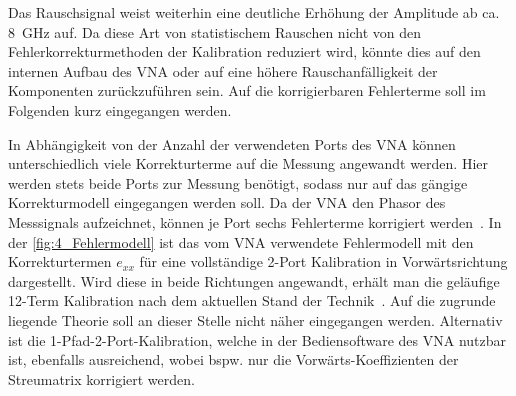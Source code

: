 Das Rauschsignal weist weiterhin eine deutliche Erhöhung der Amplitude ab ca. \SI{8}{\giga\hertz} auf. Da diese Art von statistischem Rauschen nicht von den Fehlerkorrekturmethoden der Kalibration reduziert wird, könnte dies auf den internen Aufbau des VNA oder auf eine höhere Rauschanfälligkeit der Komponenten zurückzuführen sein. Auf die korrigierbaren Fehlerterme soll im Folgenden kurz eingegangen werden.
\par
\vspace{\linespace}
In Abhängigkeit von der Anzahl der verwendeten Ports des VNA können unterschiedlich viele Korrekturterme auf die Messung angewandt werden. Hier werden stets beide Ports zur Messung benötigt, sodass nur auf das gängige Korrekturmodell eingegangen werden soll. Da der VNA den Phasor des Messsignals aufzeichnet, können je Port sechs Fehlerterme korrigiert werden~\cite{VNA-Handbuch}. In der \Abb\ref{fig:4_Fehlermodell} ist das vom VNA verwendete Fehlermodell mit den Korrekturtermen $e_{xx}$ für eine vollständige 2-Port Kalibration in Vorwärtsrichtung dargestellt. Wird diese in beide Richtungen angewandt, erhält man die geläufige 12-Term Kalibration nach dem aktuellen Stand der Technik~\cite{VNA_Error_Models_and_Calibration_Methods}. Auf die zugrunde liegende Theorie soll an dieser Stelle nicht näher eingegangen werden. Alternativ ist die 1-Pfad-2-Port-Kalibration, welche in der Bediensoftware des VNA nutzbar ist, ebenfalls ausreichend, wobei bspw. nur die Vorwärts-Koeffizienten der Streumatrix korrigiert werden. 
\par
\vspace{\linespace}


